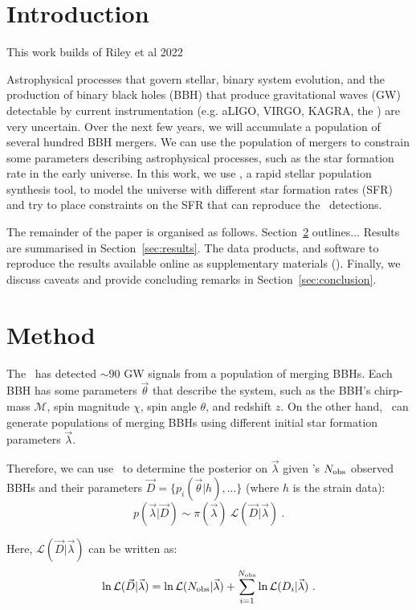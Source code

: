 \documentclass[twocolumn]{aastex631}
\begin{document}
\section{Introduction} \label{sec:intro}
This work builds of Riley et al 2022

Astrophysical processes that govern stellar, binary system evolution, and the production of binary black holes (BBH) that produce gravitational waves (GW) detectable by current instrumentation (e.g. aLIGO, VIRGO, KAGRA, the \lvk) are very uncertain. 
Over the next few years, we will accumulate a population of several hundred BBH mergers. 
We can use the population of mergers to constrain some parameters describing astrophysical processes, such as the star formation rate in the early universe. 
In this work, we use \compas, a rapid stellar population synthesis tool, to model the universe with different star formation rates (SFR) and try to place constraints on the SFR that can reproduce the \lvk\ detections. 


The remainder of the paper is organised as follows.
Section~\ref{sec:method} outlines...
Results are summarised in Section~\ref{sec:results}.
The data products, and software to reproduce the results available online as supplementary materials (\projectUrl).
Finally, we discuss caveats and provide concluding remarks in Section~\ref{sec:conclusion}.

\section{Method} \label{sec:method}


The \lvk\ has detected $\sim90$ GW signals from a population of merging BBHs. 
Each BBH has some parameters $\vec{\theta}$ that describe the system, such as the BBH's chirp-mass $\mathcal{M}$, spin magnitude $\chi$, spin angle $\theta$, and redshift $z$.
On the other hand, \compas\ can generate populations of merging BBHs using different initial star formation parameters $\vec{\lambda}$. 

Therefore, we can use \compas\ to determine the posterior on $\vec{\lambda}$ given \lvk's $N_{\rm obs}$ observed BBHs and their parameters $\vec{D} = \{ p_i(\vec{\theta}|h), ...\}$ (where $h$ is the strain data):
\begin{equation}
    p(\vec{\lambda}| \vec{D}) \sim \pi(\vec{\lambda})\ \mathcal{L}(\vec{D}| \vec{\lambda})\ .
\end{equation}


Here, $\mathcal{L}(\vec{D}| \vec{\lambda})$ can be written as:
\begin{equation}
    \ln \mathcal{L}(\vec{D}| \vec{\lambda}) = \ln \mathcal{L}(N_{\rm obs}|\vec{\lambda}) + \sum^{N_{\rm obs}}_{i=1} \ln \mathcal{L}(D_i|\vec{\lambda}) \ .
\end{equation}
\end{document}
